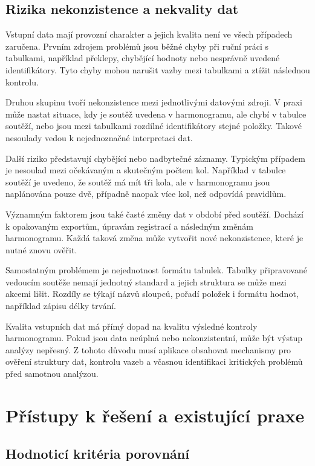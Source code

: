 \documentclass[czech, kiv, ba, he, iso690alph, pdf]{fasthesis}
\begin{document}
			\subsection{Rizika nekonzistence a nekvality dat}
	
				Vstupní data mají provozní charakter a jejich kvalita není ve všech případech zaručena. Prvním zdrojem problémů jsou běžné chyby při ruční práci s tabulkami, například překlepy, chybějící hodnoty nebo nesprávně uvedené identifikátory. Tyto chyby mohou narušit vazby mezi tabulkami a ztížit následnou kontrolu.
	
				Druhou skupinu tvoří nekonzistence mezi jednotlivými datovými zdroji. V praxi může nastat situace, kdy je soutěž uvedena v harmonogramu, ale chybí v tabulce soutěží, nebo jsou mezi tabulkami rozdílné identifikátory stejné položky. Takové nesoulady vedou k nejednoznačné interpretaci dat.
	
				Další riziko představují chybějící nebo nadbytečné záznamy. Typickým případem je nesoulad mezi očekávaným a skutečným počtem kol. Například v tabulce soutěží je uvedeno, že soutěž má mít tři kola, ale v harmonogramu jsou naplánována pouze dvě, případně naopak více kol, než odpovídá pravidlům.
	
				Významným faktorem jsou také časté změny dat v období před soutěží. Dochází k opakovaným exportům, úpravám registrací a následným změnám harmonogramu. Každá taková změna může vytvořit nové nekonzistence, které je nutné znovu ověřit.
	
				Samostatným problémem je nejednotnost formátu tabulek. Tabulky připravované vedoucím soutěže nemají jednotný standard a jejich struktura se může mezi akcemi lišit. Rozdíly se týkají názvů sloupců, pořadí položek i formátu hodnot, například zápisu délky trvání.
	
				Kvalita vstupních dat má přímý dopad na kvalitu výsledné kontroly harmonogramu. Pokud jsou data neúplná nebo nekonzistentní, může být výstup analýzy nepřesný. Z tohoto důvodu musí aplikace obsahovat mechanismy pro ověření struktury dat, kontrolu vazeb a včasnou identifikaci kritických problémů před samotnou analýzou.

		\section{Přístupy k řešení a existující praxe}

			\subsection{Hodnoticí kritéria porovnání}
			
\end{document}
